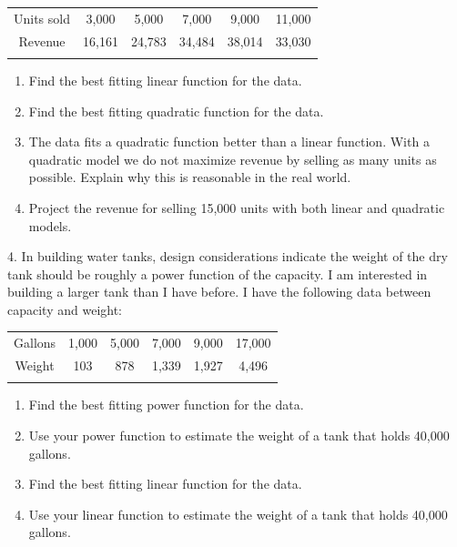 \documentclass[10pt,]{book}
\theoremstyle{plain}
\theoremstyle{definition}
\theoremstyle{definition}
\newcommand{\hrulethin}  {\noalign{\hrule height 0.04em}}
\newcommand{\hrulemedium}{\noalign{\hrule height 0.07em}}
\newcommand{\hrulethick} {\noalign{\hrule height 0.11em}}
\begin{document}
\begin{exerciselist}
%
\leavevmode%
\begin{table}
\centering
\begin{tabular}{cccccc}\hrulethick
Units sold&3,000&5,000&7,000&9,000&11,000\tabularnewline\hrulethin
Revenue&16,161&24,783&34,484&38,014&33,030\tabularnewline\hrulemedium
\end{tabular}
\end{table}
\leavevmode%
\begin{enumerate}[label=(\alph*)]
\item\hypertarget{li-84}{} Find the best fitting linear function for the data.%
\item\hypertarget{li-85}{} Find the best fitting quadratic function for the data.%
\item\hypertarget{li-86}{} The data fits a quadratic function better than a linear function.  With a quadratic model we do not maximize revenue by selling as many units as possible.  Explain why this is reasonable in the real world.%
\item\hypertarget{li-87}{} Project the revenue for selling 15,000 units with both linear and quadratic models.%
\end{enumerate}
\par\smallskip
\item[4.]\hypertarget{exercise-67}{}  In building water tanks, design considerations indicate the weight of the dry tank should be roughly a power function of the capacity.  I am interested in building a larger tank than I have before. I have the following data between capacity and weight:
%
\leavevmode%
\begin{table}
\centering
\begin{tabular}{cccccc}\hrulethick
Gallons&1,000&5,000&7,000&9,000&17,000\tabularnewline\hrulethin
Weight&103&878&1,339&1,927&4,496\tabularnewline\hrulemedium
\end{tabular}
\end{table}
\leavevmode%
\begin{enumerate}[label=(\alph*)]
\item\hypertarget{li-88}{} Find the best fitting power function for the data.%
\item\hypertarget{li-89}{} Use your power function to estimate the weight of a tank that holds 40,000 gallons.%
\item\hypertarget{li-90}{} Find the best fitting linear function for the data.%
\item\hypertarget{li-91}{} Use your linear function to estimate the weight of a tank that holds 40,000 gallons.%

\end{enumerate}
\end{exerciselist}
\end{document}
